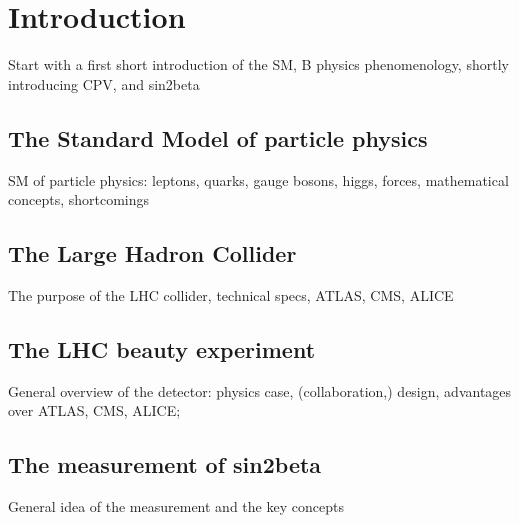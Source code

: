 
\chapter{Introduction}
Start with a first short introduction of the SM, B physics phenomenology, shortly introducing CPV, and sin2beta

\section{The Standard Model of particle physics}
SM of particle physics: leptons, quarks, gauge bosons, higgs, forces, mathematical concepts, shortcomings 

\section{The Large Hadron Collider}
The purpose of the LHC collider, technical specs, ATLAS, CMS, ALICE

\section{The LHC beauty experiment}
General overview of the detector: physics case, (collaboration,) design, advantages over ATLAS, CMS, ALICE; 

\section{The measurement of sin2beta}
General idea of the measurement and the key concepts
